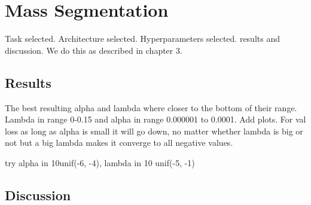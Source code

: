 \chapter{Mass Segmentation}
\label{ch:Experiment1}
	Task selected. Architecture selected. Hyperparameters selected. results and discussion.
We do this as described in chapter 3.

\section{Results}
The best resulting alpha and lambda where closer to the bottom of their range. Lambda in range 0-0.15 and alpha in range 0.000001 to 0.0001. Add plots.
For val loss as long as alpha is small it will go down, no matter whether lambda is big or not but a big lambda makes it converge to all negative values.

try alpha in 10unif(-6, -4), lambda in 10 unif(-5, -1)

\section{Discussion}
